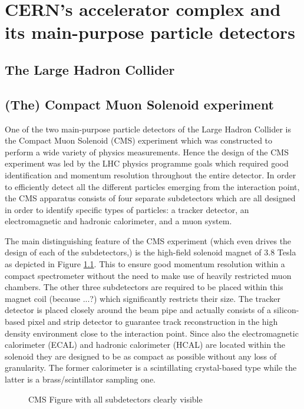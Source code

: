 \chapter{CERN's accelerator complex and its main-purpose particle detectors} \label{chp:labelTitle}

\section{The Large Hadron Collider}

\section{(The) Compact Muon Solenoid experiment} 

One of the two main-purpose particle detectors of the Large Hadron Collider is the Compact Muon Solenoid (CMS) experiment which was constructed to perform a wide variety of physics measurements. Hence the design of the CMS experiment was led by the LHC physics programme goals which required good identification and momentum resolution throughout the entire detector.
In order to efficiently detect all the different particles emerging from the interaction point, the CMS apparatus consists of four separate subdetectors which are all designed in order to identify specific types of particles: a tracker detector, an electromagnetic and hadronic calorimeter, and a muon system.

The main distinguishing feature of the CMS experiment (which even drives the design of each of the subdetectors,) is the high-field solenoid magnet of $3.8$ Tesla as depicted in Figure \ref{fig::CMSFig}. This to ensure good momentum resolution within a compact spectrometer without the need to make use of heavily restricted muon chambers. The other three subdetectors are required to be placed within this magnet coil (because ...?) which significantly restricts their size. The tracker detector is placed closely around the beam pipe and actually consists of a silicon-based pixel and strip detector to guarantee track reconstruction in the high density environment close to the interaction point. Since also the electromagnetic calorimeter (ECAL) and hadronic calorimeter (HCAL) are located within the solenoid they are designed to be as compact as possible without any loss of granularity. The former calorimeter is a scintillating crystal-based type while the latter is a brass/scintillator sampling one.
\begin{figure}[h!t]
 \centering
 \caption{CMS Figure with all subdetectors clearly visible} \label{fig::CMSFig}
\end{figure}


